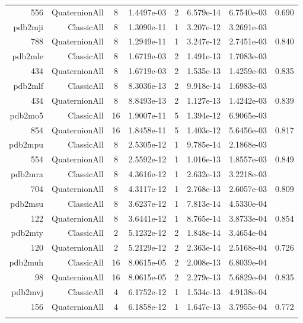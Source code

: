 \begin{xltabular}{\textwidth}{r|rcS[table-format=1.4e+2]cS[table-format=1.3e+2]S[table-format=1.4e+2]S[table-format=-1.3]}
556 & QuaternionAll & 8 & 1.4497e-03 & 2 & 6.579e-14 & 6.7540e-03 & 0.690\\  \addlinespace
pdb2mji & ClassicAll & 8 & 1.3090e-11 & 1 & 3.207e-12 & 3.2691e-03 & \\
788 & QuaternionAll & 8 & 1.2949e-11 & 1 & 3.247e-12 & 2.7451e-03 & 0.840\\  \addlinespace
pdb2mle & ClassicAll & 8 & 1.6719e-03 & 2 & 1.491e-13 & 1.7083e-03 & \\
434 & QuaternionAll & 8 & 1.6719e-03 & 2 & 1.535e-13 & 1.4259e-03 & 0.835\\  \addlinespace
pdb2mlf & ClassicAll & 8 & 8.3036e-13 & 2 & 9.918e-14 & 1.6983e-03 & \\
434 & QuaternionAll & 8 & 8.8493e-13 & 2 & 1.127e-13 & 1.4242e-03 & 0.839\\  \addlinespace
pdb2mo5 & ClassicAll & 16 & 1.9007e-11 & 5 & 1.394e-12 & 6.9065e-03 & \\
854 & QuaternionAll & 16 & 1.8458e-11 & 5 & 1.403e-12 & 5.6456e-03 & 0.817\\  \addlinespace
pdb2mpu & ClassicAll & 8 & 2.5305e-12 & 1 & 9.785e-14 & 2.1868e-03 & \\
554 & QuaternionAll & 8 & 2.5592e-12 & 1 & 1.016e-13 & 1.8557e-03 & 0.849\\  \addlinespace
pdb2mra & ClassicAll & 8 & 4.3616e-12 & 1 & 2.632e-13 & 3.2218e-03 & \\
704 & QuaternionAll & 8 & 4.3117e-12 & 1 & 2.768e-13 & 2.6057e-03 & 0.809\\  \addlinespace
pdb2msu & ClassicAll & 8 & 3.6237e-12 & 1 & 7.813e-14 & 4.5330e-04 & \\
122 & QuaternionAll & 8 & 3.6441e-12 & 1 & 8.765e-14 & 3.8733e-04 & 0.854\\  \addlinespace
pdb2mty & ClassicAll & 2 & 5.1232e-12 & 2 & 1.848e-14 & 3.4654e-04 & \\
120 & QuaternionAll & 2 & 5.2129e-12 & 2 & 2.363e-14 & 2.5168e-04 & 0.726\\  \addlinespace
pdb2muh & ClassicAll & 16 & 8.0615e-05 & 2 & 2.008e-13 & 6.8039e-04 & \\
98 & QuaternionAll & 16 & 8.0615e-05 & 2 & 2.279e-13 & 5.6829e-04 & 0.835\\  \addlinespace
pdb2mvj & ClassicAll & 4 & 6.1752e-12 & 1 & 1.534e-13 & 4.9138e-04 & \\
156 & QuaternionAll & 4 & 6.1858e-12 & 1 & 1.647e-13 & 3.7955e-04 & 0.772\\  \addlinespace

\end{xltabular}
